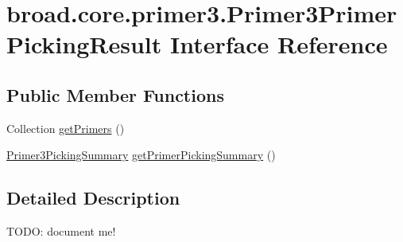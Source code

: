 \hypertarget{interfacebroad_1_1core_1_1primer3_1_1_primer3_primer_picking_result}{\section{broad.\+core.\+primer3.\+Primer3\+Primer\+Picking\+Result Interface Reference}
\label{interfacebroad_1_1core_1_1primer3_1_1_primer3_primer_picking_result}
}
\subsection*{Public Member Functions}
\begin{DoxyCompactItemize}
\item 
Collection \hyperlink{interfacebroad_1_1core_1_1primer3_1_1_primer3_primer_picking_result_a561371902252808073e96d020f498e8e}{get\+Primers} ()
\item 
\hyperlink{interfacebroad_1_1core_1_1primer3_1_1_primer3_picking_summary}{Primer3\+Picking\+Summary} \hyperlink{interfacebroad_1_1core_1_1primer3_1_1_primer3_primer_picking_result_a6190f217893c55d20bdf4f726d568972}{get\+Primer\+Picking\+Summary} ()
\end{DoxyCompactItemize}


\subsection{Detailed Description}
T\+O\+D\+O\+: document me! 

